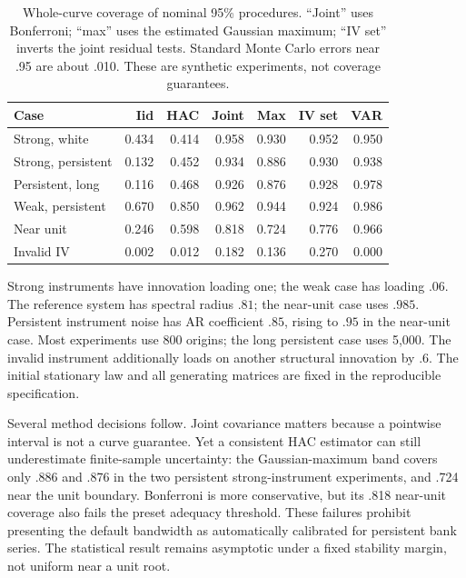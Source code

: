 \begin{table}[htbp]\centering\small


\begin{tabular}{lrrrrrr}
\toprule
Case & Iid & HAC & Joint & Max & IV set & VAR\\
\midrule
Strong, white & 0.434 & 0.414 & 0.958 & 0.930 & 0.952 & 0.950\\
Strong, persistent & 0.132 & 0.452 & 0.934 & 0.886 & 0.930 & 0.938\\
Persistent, long & 0.116 & 0.468 & 0.926 & 0.876 & 0.928 & 0.978\\
Weak, persistent & 0.670 & 0.850 & 0.962 & 0.944 & 0.924 & 0.986\\
Near unit & 0.246 & 0.598 & 0.818 & 0.724 & 0.776 & 0.966\\
Invalid IV & 0.002 & 0.012 & 0.182 & 0.136 & 0.270 & 0.000\\
\bottomrule
\end{tabular}



\caption{Whole-curve coverage of nominal 95\% procedures. ``Joint'' uses
Bonferroni; ``max'' uses the estimated Gaussian maximum; ``IV set'' inverts
the joint residual tests. Standard Monte Carlo errors near .95 are about
.010. These are synthetic experiments, not coverage guarantees.}
\label{s4:response-coverage}
\end{table}

Strong instruments have innovation loading one; the weak case has loading
$.06$. The reference system has spectral radius $.81$; the near-unit case
uses $.985$. Persistent instrument noise has AR coefficient $.85$, rising
to $.95$ in the near-unit case. Most experiments use 800 origins; the long
persistent case uses 5,000. The invalid instrument additionally loads on
another structural innovation by $.6$. The initial stationary law and
all generating matrices are fixed in the reproducible specification.

Several method decisions follow. Joint covariance matters because a
pointwise interval is not a curve guarantee. Yet a consistent HAC estimator
can still underestimate finite-sample uncertainty: the Gaussian-maximum
band covers only .886 and .876 in the two persistent strong-instrument
experiments, and .724 near the unit boundary. Bonferroni is more conservative,
but its .818 near-unit coverage also fails the preset adequacy threshold.
These failures prohibit presenting the default bandwidth as automatically
calibrated for persistent bank series. The statistical result remains
asymptotic under a fixed stability margin, not uniform near a unit root.

